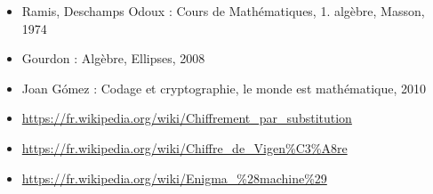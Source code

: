 \documentclass[french]{article}
\begin{document}
%  
  \begin{itemize}
    \item Ramis, Deschamps Odoux : Cours de Mathématiques, 1. algèbre,
      Masson, 1974
    \item Gourdon : Algèbre, Ellipses, 2008
    \item Joan G\'omez : Codage et cryptographie, le monde est
      mathématique, 2010
    \item
      \url{https://fr.wikipedia.org/wiki/Chiffrement_par_substitution}
    \item \url{https://fr.wikipedia.org/wiki/Chiffre_de_Vigen\%C3\%A8re}
    \item \url{https://fr.wikipedia.org/wiki/Enigma_\%28machine\%29}
  \end{itemize}
\end{document}
